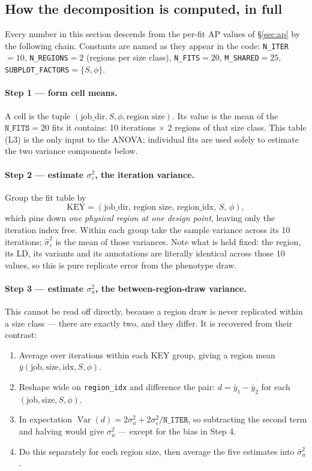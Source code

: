 \subsection{How the decomposition is computed, in full}\label{sec:vhow}

Every number in this section descends from the per-fit AP values of
\S\ref{sec:ap} by the following chain. Constants are named as they appear in the
code: \texttt{N\_ITER}$=10$, \texttt{N\_REGIONS}$=2$ (regions per size class),
\texttt{N\_FITS}$=20$, \texttt{M\_SHARED}$=25$, \texttt{SUBPLOT\_FACTORS}$=\{S,\phi\}$.

\paragraph{Step 1 --- form cell means.}
A cell is the tuple $(\text{job\_dir},S,\phi,\text{region size})$. Its value is
the mean of the $\texttt{N\_FITS}=20$ fits it contains: 10 iterations $\times$ 2
regions of that size class. This table (L3) is the only input to the ANOVA;
individual fits are used solely to estimate the two variance components below.

\paragraph{Step 2 --- estimate $\sigma^2_\varepsilon$, the iteration variance.}
Group the fit table by
\[
\mathrm{KEY}=(\text{job\_dir},\,\text{region size},\,\text{region\_idx},\,S,\,\phi),
\]
which pins down \emph{one physical region at one design point}, leaving only the
iteration index free. Within each group take the sample variance across its 10
iterations; $\hat\sigma^2_\varepsilon$ is the mean of those variances. Note what
is held fixed: the region, its LD, its variants and its annotations are
literally identical across those 10 values, so this is pure replicate error from
the phenotype draw.

\paragraph{Step 3 --- estimate $\sigma^2_u$, the between-region-draw variance.}
This cannot be read off directly, because a region draw is never replicated
within a size class --- there are exactly two, and they differ. It is recovered
from their contrast:

\begin{enumerate}
\item Average over iterations within each KEY group, giving a region mean
$\bar y(\text{job},\text{size},\text{idx},S,\phi)$.
\item Reshape wide on \texttt{region\_idx} and difference the pair:
$d = \bar y_1 - \bar y_2$ for each $(\text{job},\text{size},S,\phi)$.
\item In expectation
$\operatorname{Var}(d) = 2\sigma^2_u + 2\sigma^2_\varepsilon/\texttt{N\_ITER}$,
so subtracting the second term and halving would give $\sigma^2_u$ --- except
for the bias in Step 4.
\item Do this separately for each region size, then average the five estimates
into $\bar\sigma^2_u$.
\end{enumerate}

